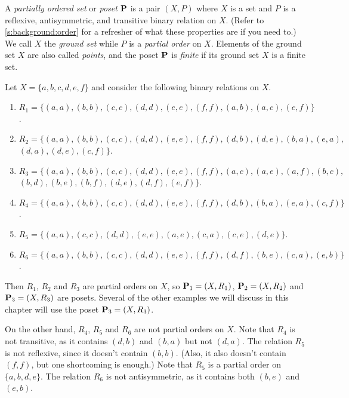 A \textit{partially ordered set} or \textit{poset} $\mathbf{P}$ is a pair
$(X,P)$ where $X$ is a set and $P$ is a reflexive, antisymmetric, and
transitive binary relation on $X$. (Refer to \autoref{s:background:order} for a
refresher of what these properties are if you need to.) We call $X$
the \textit{ground set} while $P$ is a \textit{partial order} on
$X$. Elements of the ground set $X$ are also called \textit{points},
and the poset $\mathbf{P}$ is \textit{finite} if its ground set $X$ is a
finite set.

\begin{example}\label{exa:binaryrel}
Let $X=\{a,b,c,d,e,f\}$ and consider the following binary relations
on $X$.
\begin{enumerate}
\item $R_1=\{(a,a),(b,b),(c,c),(d,d),(e,e),(f,f),(a,b),(a,c),(e,f)\}$.
\item $R_2=\{(a,a),(b,b),(c,c),(d,d),(e,e),(f,f),(d,b),(d,e),(b,a),(e,a),$\\
 $(d,a),(d,e),(c,f)\}$.
\item $R_3=\{(a,a),(b,b),(c,c),(d,d),(e,e),(f,f),(a,c),(a,e),(a,f),(b,c),$\\
 $(b,d),(b,e),(b,f),(d,e),(d,f),(e,f)\}$.
\item $R_4=\{(a,a),(b,b),(c,c),(d,d),(e,e),(f,f),(d,b),(b,a),(e,a),(c,f)\}$.
\item $R_5=\{(a,a),(c,c),(d,d),(e,e),(a,e),(c,a),(c,e),(d,e)\}$.
\item $R_6=\{(a,a),(b,b),(c,c),(d,d),(e,e),(f,f),(d,f),(b,e),(c,a),(e,b)\}$.
\end{enumerate}
Then $R_1$, $R_2$ and $R_3$ are partial orders on $X$, so $\mathbf{P}_1=(X,R_1)$,
$\mathbf{P}_2=(X,R_2)$ and $\mathbf{P}_3=(X,R_3)$ are posets.  Several of the other examples
we will discuss in this chapter will use the poset $\mathbf{P}_3=(X,R_3)$.  

On the other hand, $R_4$, $R_5$ and $R_6$ are not partial orders on
$X$.  Note that $R_4$ is not transitive, as it contains $(d,b)$ and
$(b,a)$ but not $(d,a)$.  The relation $R_5$ is not reflexive, since
it doesn't contain $(b,b)$.  (Also, it also doesn't contain $(f,f)$,
but one shortcoming is enough.) Note that $R_5$ is a partial order on
$\{a,b,d,e\}$.  The relation $R_6$ is not antisymmetric, as it
contains both $(b,e)$ and $(e,b)$.
\end{example}

